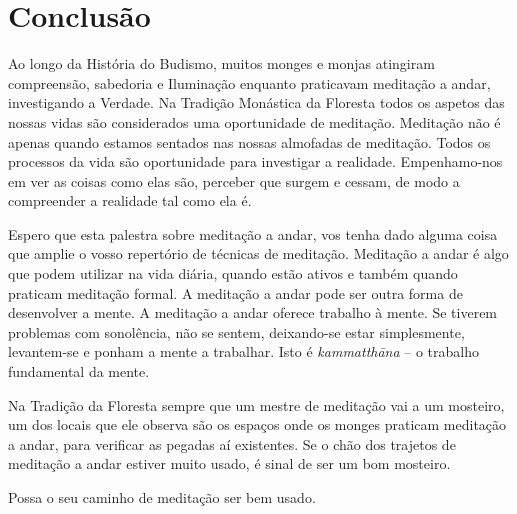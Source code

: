 \chapter{Conclusão}

Ao longo da História do Budismo, muitos monges e monjas atingiram
compreensão, sabedoria e Iluminação enquanto praticavam meditação a
andar, investigando a Verdade. Na Tradição Monástica da Floresta todos
os aspetos das nossas vidas são considerados uma oportunidade de
meditação. Meditação não é apenas quando estamos sentados nas nossas
almofadas de meditação. Todos os processos da vida são oportunidade para
investigar a realidade. Empenhamo-nos em ver as coisas como elas são,
perceber que surgem e cessam, de modo a compreender a realidade tal como
ela é.

Espero que esta palestra sobre meditação a andar, vos tenha dado alguma
coisa que amplie o vosso repertório de técnicas de meditação. Meditação
a andar é algo que podem utilizar na vida diária, quando estão ativos e
também quando praticam meditação formal. A meditação a andar pode ser
outra forma de desenvolver a mente. A meditação a andar oferece trabalho
à mente. Se tiverem problemas com sonolência, não se sentem, deixando-se
estar simplesmente, levantem-se e ponham a mente a trabalhar. Isto é
\emph{kammatthāna} -- o trabalho fundamental da mente.

Na Tradição da Floresta sempre que um mestre de meditação vai a um
mosteiro, um dos locais que ele observa são os espaços onde os monges
praticam meditação a andar, para verificar as pegadas aí existentes. Se
o chão dos trajetos de meditação a andar estiver muito usado, é sinal de
ser um bom mosteiro.


Possa o seu caminho de meditação ser bem usado.

